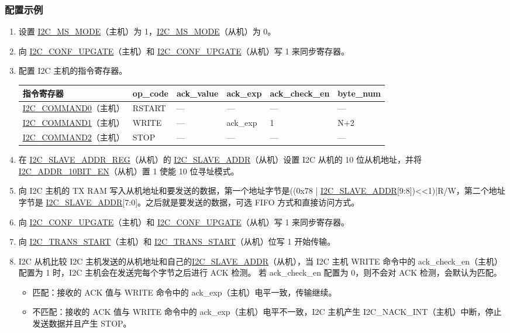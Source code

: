 \documentclass[main\_\_CN.tex]{subfiles}
\begin{document}
\subsubsection{配置示例}
\begin{enumerate}
\item 设置 \hyperref[fielddesc:I2CMSMODE]{I2C\_MS\_MODE}（主机）为 1，\hyperref[fielddesc:I2CMSMODE]{I2C\_MS\_MODE}（从机）为 0。
\item 向 \hyperref[fielddesc:I2CCONFUPGATE]{I2C\_CONF\_UPGATE}（主机）和 \hyperref[fielddesc:I2CCONFUPGATE]{I2C\_CONF\_UPGATE}（从机）写 1 来同步寄存器。
\item 配置 I2C 主机的指令寄存器。

\begin{longtable}{ | p{4cm} | p{2cm} | p{2cm} | p{2cm} |p{2cm} | p{2cm} |}
\hline\rowcolor{lightgray}
指令寄存器& op\_code & ack\_value&ack\_exp&ack\_check\_en&byte\_num  \\ \hline
\hyperref[fielddesc:I2CCOMMAND0]{I2C\_COMMAND0}（主机）& RSTART& ---&---&---&---  \\ \hline
\hyperref[fielddesc:I2CCOMMAND1]{I2C\_COMMAND1}（主机）& WRITE& ---&ack\_exp&1&N+2  \\ \hline
\hyperref[fielddesc:I2CCOMMAND2]{I2C\_COMMAND2}（主机）& STOP& ---&---&---&---  \\ \hline
\end{longtable}

\item 在 \hyperref[regdesc:I2CSLAVEADDRREG]{I2C\_SLAVE\_ADDR\_REG}（从机）的 \hyperref[fielddesc:I2CSLAVEADDR]{I2C\_SLAVE\_ADDR}（从机）设置 I2C 从机的 10 位从机地址，并将 \hyperref[fielddesc:I2CADDR10BITEN]{I2C\_ADDR\_10BIT\_EN}（从机）置 1 使能 10 位寻址模式。
\item 向 I2C 主机的 TX RAM 写入从机地址和要发送的数据，第一个地址字节是((0x78 | \hyperref[fielddesc:I2CSLAVEADDR]{I2C\_SLAVE\_ADDR}[9:8])<<1)|R/W，第二个地址字节是 \hyperref[fielddesc:I2CSLAVEADDR]{I2C\_SLAVE\_ADDR}[7:0]。之后就是要发送的数据，可选 FIFO 方式和直接访问方式。
\item 向 \hyperref[fielddesc:I2CCONFUPGATE]{I2C\_CONF\_UPGATE}（主机）和 \hyperref[fielddesc:I2CCONFUPGATE]{I2C\_CONF\_UPGATE}（从机）写 1 来同步寄存器。
\item 向 \hyperref[fielddesc:I2CTRANSSTART]{I2C\_TRANS\_START}（主机）和 \hyperref[fielddesc:I2CTRANSSTART]{I2C\_TRANS\_START}（从机）位写 1 开始传输。
\item I2C 从机比较 I2C 主机发送的从机地址和自己的\hyperref[fielddesc:I2CSLAVEADDR]{I2C\_SLAVE\_ADDR}（从机），当 I2C 主机 WRITE 命令中的 ack\_check\_en（主机）配置为 1 时，I2C 主机会在发送完每个字节之后进行 ACK 检测。 若 ack\_check\_en 配置为 0，则不会对 ACK 检测，会默认为匹配。
\begin{itemize}
\item 匹配：接收的 ACK 值与 WRITE 命令中的 ack\_exp（主机）电平一致，传输继续。
\item 不匹配：接收的 ACK 值与 WRITE 命令中的 ack\_exp（主机）电平不一致，I2C 主机产生 I2C\_NACK\_INT（主机）中断，停止发送数据并且产生 STOP。
\end{itemize}


\end{enumerate}
\end{document}
